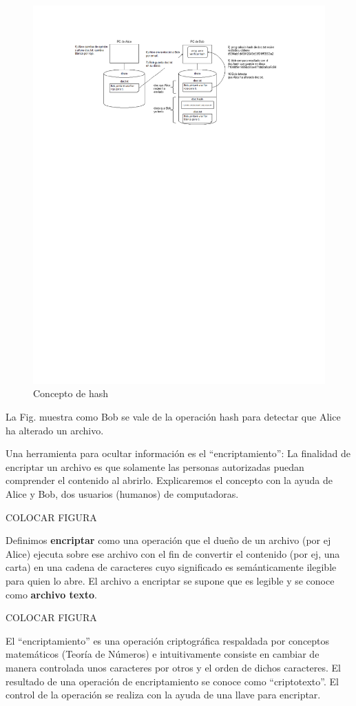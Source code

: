 \documentclass[12pt]{report} %
\begin{document}
\begin{itemize}
\begin{figure}
\centering
\includegraphics[width=0.85\columnwidth]{imagenes/gatorojo.pdf}
\caption{Concepto de hash}
\label{gatorojo}
\end{figure} 

La Fig.  muestra como Bob se vale de la operación hash para detectar que Alice ha alterado un archivo.

Una herramienta para ocultar información es el “encriptamiento”: La finalidad de encriptar un archivo es que solamente las personas autorizadas puedan comprender el contenido al abrirlo.  Explicaremos el concepto con la ayuda de Alice y Bob, dos usuarios (humanos) de computadoras.

COLOCAR FIGURA

Definimos \textbf{encriptar} como una operación que el dueño de un archivo (por ej Alice) ejecuta sobre ese archivo con el fin de convertir el contenido (por ej, una carta) en una cadena de caracteres cuyo significado es semánticamente ilegible para quien lo abre. El archivo a encriptar se supone que es legible y se conoce como \textbf{archivo texto}.

COLOCAR FIGURA


El “encriptamiento” es una operación criptográfica respaldada por conceptos matemáticos (Teoría de Números) e intuitivamente consiste en cambiar de manera controlada unos caracteres por otros y el orden de dichos caracteres. El resultado de una operación de encriptamiento se conoce como “criptotexto”. El control de la operación se realiza con la ayuda de una llave para encriptar.


\end{itemize}
\end{document}
